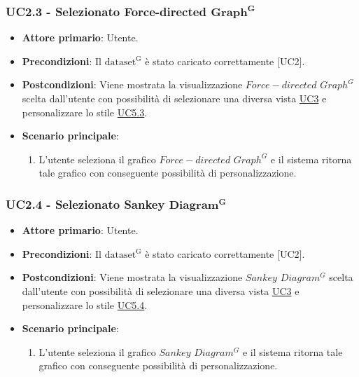 \subsubsection{UC2.3 - Selezionato Force-directed ${\mathbf{Graph^{G}}}$}
\label{sec:UC2.3}
\begin{itemize}
    \item \textbf{Attore primario}: Utente.
    \item \textbf{Precondizioni}: Il ${\mathrm{dataset^{G}}}$ è stato caricato correttamente [UC2].
    \item \textbf{Postcondizioni}: Viene mostrata la visualizzazione $Force-directed$ $Graph^{G}$ scelta dall'utente con possibilità di selezionare una diversa vista \hyperref[sec:UC3]{UC3} e personalizzare lo stile \hyperref[sec:UC5.3]{UC5.3}. %
    \item \textbf{Scenario principale}:
          \begin{enumerate}
              \item L'utente seleziona il grafico $Force-directed$ $Graph^{G}$ e il sistema ritorna tale grafico con conseguente possibilità di personalizzazione. 
          \end{enumerate}
\end{itemize}

\subsubsection{UC2.4 - Selezionato Sankey ${\mathbf{Diagram^{G}}}$}
\label{sec:UC2.4}
\begin{itemize}
    \item \textbf{Attore primario}: Utente.
    \item \textbf{Precondizioni}: Il ${\mathrm{dataset^{G}}}$ è stato caricato correttamente [UC2].
    \item \textbf{Postcondizioni}: Viene mostrata la visualizzazione $Sankey$ $Diagram^{G}$ scelta dall'utente con possibilità di selezionare una diversa vista \hyperref[sec:UC3]{UC3} e personalizzare lo stile \hyperref[sec:UC5.4]{UC5.4}. %
    \item \textbf{Scenario principale}:
          \begin{enumerate}
              \item L'utente seleziona il grafico $Sankey$ $Diagram^{G}$ e il sistema ritorna tale grafico con conseguente possibilità di personalizzazione. 
          \end{enumerate}
\end{itemize}
\newpage

